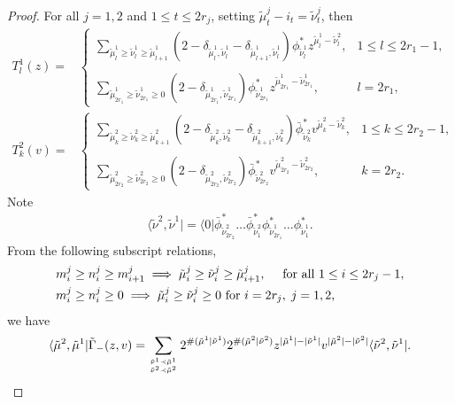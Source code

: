 \documentclass[11pt,reqno]{amsart}
\numberwithin{equation}{section}
\begin{document}
\begin{proof}
		
		For all $j=1,2$ and $1 \leq t \leq 2r_{j}$, setting $\tilde{\mu}^{j}_{t}-i_{t}=\tilde{\nu}^{j}_{t}$,
		then
		\begin{align}
			T_{l}^{1}(z)=&\left\{
			\begin{array}
				{ll}\sum\limits_{\tilde{\mu}^{1}_{l} \geq  \tilde{\nu}^{1}_{l} \geq \tilde{\mu}^{1}_{l+1}}
				(2 - \delta_{\tilde{\mu}^{1}_{l},\tilde{\nu}^{1}_{l}}
				-\delta_{\tilde{\mu}^{1}_{l+1},\tilde{\nu}^{1}_{l}}) 	
				\phi_{\tilde{\nu}^{1}_{l}}^*  z^{\tilde{\mu}^{1}_{l}-\tilde{\nu}^{2}_{l}} , & 1 \leq l \leq 2r_{1}-1, \\
				\\
				\sum\limits_{\tilde{\mu}^{1}_{2r_{1}} \geq  \tilde{\nu}^{1}_{2r_{1}} \geq 0}  (2 - \delta_{\tilde{\mu}^{1}_{2r_{1}},\tilde{\nu}^{1}_{2r_{1}}})
				\phi_{\tilde{\nu}^{1}_{2r_{1}}}^*  z^{\tilde{\mu}^{1}_{2r_{1}}-\tilde{\nu}^{1}_{2r_{1}}},
				& l=2r_{1},
			\end{array}\right.\\
			T_{k}^{2}(v)=&\left\{
			\begin{array}
				{ll}\sum\limits_{\tilde{\mu}^{2}_{k} \geq  \tilde{\nu}^{2}_{k} \geq \tilde{\mu}^{2}_{k+1}}
				(2 - \delta_{\tilde{\mu}^{2}_{k},\tilde{\nu}^{2}_{k}}
				-\delta_{\tilde{\mu}^{2}_{k+1},\tilde{\nu}^{2}_{k}}) 	
				\bar{\phi}_{\tilde{\nu}^{2}_{k}}^*  v^{\tilde{\mu}^{2}_{k}-\tilde{\nu}^{2}_{k}}, & 1 \leq k \leq 2r_{2}-1, \\
				\\
				\sum\limits_{\tilde{\mu}^{2}_{2r_{2}} \geq  \tilde{\nu}^{2}_{2r_{2}} \geq 0}  (2 - \delta_{\tilde{\mu}^{2}_{2r_{2}},\tilde{\nu}^{2}_{2r_{2}}})
				\bar{\phi}_{\tilde{\nu}^{2}_{2r_{2}}}^*  v^{\tilde{\mu}^{2}_{2r_{2}}-\tilde{\nu}^{2}_{2r_{2}}},
				& k=2r_{2}.
			\end{array}\right.
		\end{align}
		Note
		\begin{align}
			\langle \tilde{\nu}^2,\tilde{\nu}^1|=\langle 0|\bar{\phi}_{\tilde{\nu}^{2}_{2r_{2}}}^* \dots \bar{\phi}_{\tilde{\nu}^{2}_1}^*
			\phi_{\tilde{\nu}^{1}_{2r_{1}}}^* \dots \phi_{\tilde{\nu}^{1}_1}^*.
		\end{align}
From the following subscript relations,
		\begin{align}
			&m_{i}^{j} \geq n^j_{i} \geq m_{i+1}^{j}  \implies  \tilde{\mu}_i^{j}\geq \tilde{\nu}_i^{j} \geq \tilde{\mu}_{i+1}^{j},\quad
			\text{ for all } 1 \leq i \leq 2r_{j}-1, \notag\\
			&m_{i}^{j} \geq n^j_{i} \geq 0
			\implies  \tilde{\mu}_i^{j} \geq \tilde{\nu}_i^{j} \geq 0
			\text{ for } i=2r_{j}, \;  j=1,2,
		\end{align}
we have
		\begin{align}
			\langle \tilde{\mu}^2,\tilde{\mu}^1|\tilde{\Gamma}_-(z,v)
			=\sum_{{\tilde{\nu}^1 \prec \tilde{\mu}^1}	\atop{\tilde{\nu}^2 \prec \tilde{\mu}^2}}
			2^{\#(\tilde{\mu}^1|\tilde{\nu}^1) }2^{\#(\tilde{\mu}^2|\tilde{\nu}^2) }
			z^{|\tilde{\mu}^1| - |\tilde{\nu}^1|}    v^{|\tilde{\mu}^2| - |\tilde{\nu}^2|}     \langle \tilde{\nu}^2,\tilde{\nu}^1|.
		\end{align}
		

\end{proof}
\end{document}
